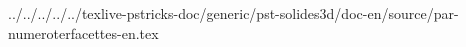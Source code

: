 ../../../../../texlive-pstricks-doc/generic/pst-solides3d/doc-en/source/par-numeroterfacettes-en.tex